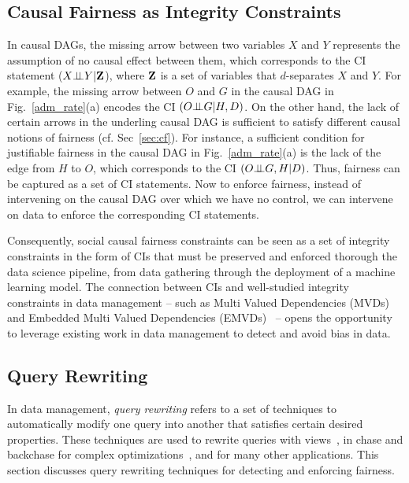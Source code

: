 \documentclass[11pt]{article}
\begin{document}
\subsection{Causal Fairness as Integrity Constraints}
\label{sec:integ}
In causal DAGs, the missing arrow between two variables $X$ and $Y$ represents the assumption of no causal effect between them, which corresponds to the CI statement ($X \mbox{$\perp\!\!\!\perp$} Y | {\mathbf{Z}}$), where ${\mathbf{Z}}$ is a set of variables that $d$-separates $X$ and $Y$. For example, the missing arrow between $O$ and $G$  in the causal DAG in Fig.~\ref{adm_rate}(a) encodes the CI $(O \mbox{$\perp\!\!\!\perp$} G| H,D)$. On the other hand, the lack of certain arrows in the underling causal DAG is sufficient to satisfy different causal notions of fairness (cf. Sec~\ref{sec:cf}). For instance, a sufficient condition for justifiable fairness in the causal DAG in  Fig.~\ref{adm_rate}(a) is the lack of the edge from $H$ to $O$, which corresponds to the CI $(O \mbox{$\perp\!\!\!\perp$} G, H| D)$. Thus, fairness can be captured as a set of CI statements. Now to enforce fairness, instead of intervening on the causal DAG over which we have no control, we can intervene on data to enforce the corresponding CI statements. 

Consequently, social causal fairness constraints can be seen as a set of integrity constraints in the form of CIs that must be preserved and enforced thorough the data science pipeline, from data gathering through the deployment of a machine learning model. The connection between CIs and well-studied integrity constraints in data management -- such as Multi Valued Dependencies (MVDs) and Embedded Multi Valued Dependencies (EMVDs)~\cite{AbiteboulHVBook} -- opens the opportunity to leverage existing work in data management to detect and avoid bias in data.


\vspace{-0.3cm}
\subsection{Query Rewriting}
In data management, \textit{query rewriting} refers to a set of techniques to automatically modify one query into another that satisfies certain desired properties. These techniques are used to rewrite queries with views~\cite{DBLP:conf/pods/LevyMSS95}, in chase and backchase for complex optimizations~\cite{DBLP:conf/sigmod/PopaDST00}, and for many other applications.  This section discusses query rewriting techniques for detecting and enforcing fairness.
\end{document}
